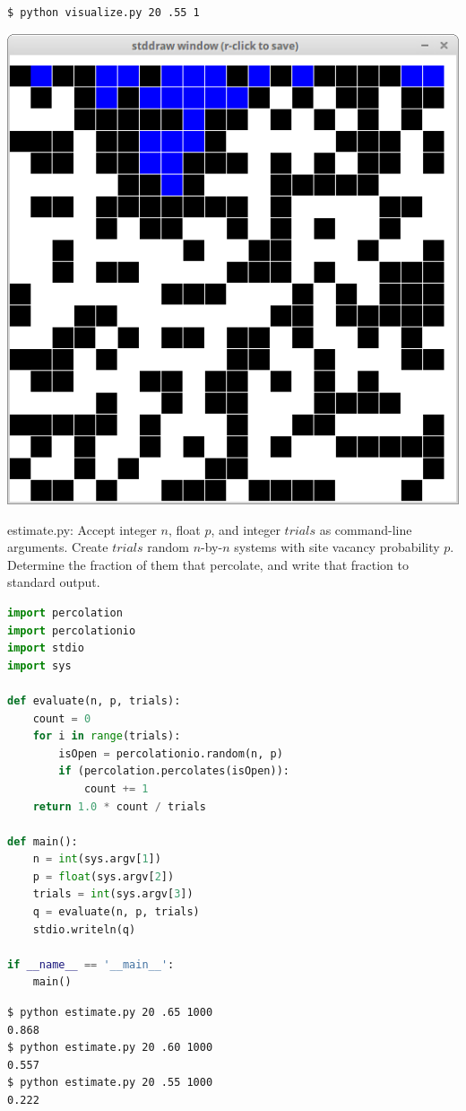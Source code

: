 \documentclass[8pt,a4paper,compress,handout]{beamer}
\begin{document}
\begin{frame}[fragile]
\begin{minipage}{160pt}
\begin{lstlisting}[language={}]
$ python visualize.py 20 .55 1
\end{lstlisting}
\end{minipage}%
\begin{minipage}{140pt}
\hfill \includegraphics[scale=0.15]{figures/percolation9.png}
\end{minipage}
\end{frame}

\begin{frame}[fragile]
\begin{framed}
\tiny estimate.py: Accept integer $n$, float $p$, and integer $trials$ as command-line arguments. Create $trials$ random $n$-by-$n$ systems with site vacancy probability $p$. Determine the fraction of them that percolate, and
write that fraction to standard output.
\end{framed}

\begin{lstlisting}[language=Python]
import percolation
import percolationio
import stdio
import sys

def evaluate(n, p, trials):
    count = 0
    for i in range(trials):
        isOpen = percolationio.random(n, p)
        if (percolation.percolates(isOpen)):
            count += 1
    return 1.0 * count / trials

def main():
    n = int(sys.argv[1])
    p = float(sys.argv[2])
    trials = int(sys.argv[3])
    q = evaluate(n, p, trials)
    stdio.writeln(q)

if __name__ == '__main__':
    main()
\end{lstlisting}

\begin{lstlisting}[language={}]
$ python estimate.py 20 .65 1000
0.868
$ python estimate.py 20 .60 1000
0.557
$ python estimate.py 20 .55 1000
0.222
\end{lstlisting}
\end{frame}
\end{document}
